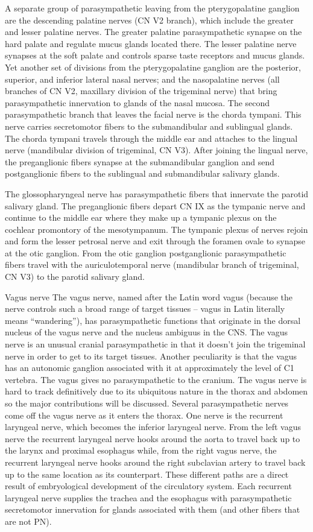 A separate group of parasympathetic leaving from the pterygopalatine ganglion are the descending palatine nerves (CN V2 branch), which include the greater and lesser palatine nerves. The greater palatine parasympathetic synapse on the hard palate and regulate mucus glands located there. The lesser palatine nerve synapses at the soft palate and controls sparse taste receptors and mucus glands. Yet another set of divisions from the pterygopalatine ganglion are the posterior, superior, and inferior lateral nasal nerves; and the nasopalatine nerves (all branches of CN V2, maxillary division of the trigeminal nerve) that bring parasympathetic innervation to glands of the nasal mucosa. The second parasympathetic branch that leaves the facial nerve is the chorda tympani. This nerve carries secretomotor fibers to the submandibular and sublingual glands. The chorda tympani travels through the middle ear and attaches to the lingual nerve (mandibular division of trigeminal, CN V3). After joining the lingual nerve, the preganglionic fibers synapse at the submandibular ganglion and send postganglionic fibers to the sublingual and submandibular salivary glands.

The glossopharyngeal nerve has parasympathetic fibers that innervate the parotid salivary gland. The preganglionic fibers depart CN IX as the tympanic nerve and continue to the middle ear where they make up a tympanic plexus on the cochlear promontory of the mesotympanum. The tympanic plexus of nerves rejoin and form the lesser petrosal nerve and exit through the foramen ovale to synapse at the otic ganglion. From the otic ganglion postganglionic parasympathetic fibers travel with the auriculotemporal nerve (mandibular branch of trigeminal, CN V3) to the parotid salivary gland.

Vagus nerve
The vagus nerve, named after the Latin word vagus (because the nerve controls such a broad range of target tissues -- vagus in Latin literally means ``wandering''), has parasympathetic functions that originate in the dorsal nucleus of the vagus nerve and the nucleus ambiguus in the CNS. The vagus nerve is an unusual cranial parasympathetic in that it doesn't join the trigeminal nerve in order to get to its target tissues. Another peculiarity is that the vagus has an autonomic ganglion associated with it at approximately the level of C1 vertebra. The vagus gives no parasympathetic to the cranium. The vagus nerve is hard to track definitively due to its ubiquitous nature in the thorax and abdomen so the major contributions will be discussed. Several parasympathetic nerves come off the vagus nerve as it enters the thorax. One nerve is the recurrent laryngeal nerve, which becomes the inferior laryngeal nerve. From the left vagus nerve the recurrent laryngeal nerve hooks around the aorta to travel back up to the larynx and proximal esophagus while, from the right vagus nerve, the recurrent laryngeal nerve hooks around the right subclavian artery to travel back up to the same location as its counterpart. These different paths are a direct result of embryological development of the circulatory system. Each recurrent laryngeal nerve supplies the trachea and the esophagus with parasympathetic secretomotor innervation for glands associated with them (and other fibers that are not PN).

